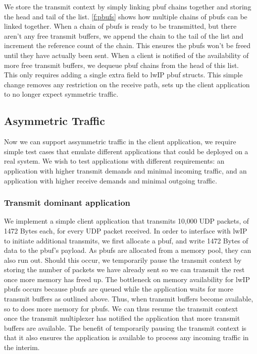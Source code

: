 We store the transmit context by simply linking pbuf chains together and storing the head and tail of the list. 
\ref{f:pbufs} shows how multiple chains of pbufs can be linked together. When a chain of pbufs is ready to
be transmitted, but there aren't any free transmit buffers, we append the chain to the tail of the list and 
increment the reference count of the chain. This ensures the pbufs won't be freed until they have actually been sent.
When a client is notified of the availability of more free transmit buffers, we dequeue pbuf chains from the head of
this list. This only requires adding a single extra field to lwIP pbuf structs. This simple change removes any
restriction on the receive path, sets up the client application to no longer expect symmetric traffic.\\

\subsection{Asymmetric Traffic}
Now we can support assymmetric traffic in the client application, we require simple test cases that emulate different
applications that could be deployed on a real system. We wish to test
applications with different requirements: an application with higher transmit demands and minimal incoming traffic,
and an application with higher receive demands and minimal outgoing traffic. 

\subsubsection{Transmit dominant application}\label{s:transmit_dom}
We implement a simple client application that transmits 10,000 UDP packets, of 1472 Bytes each, for every UDP packet received.
In order to interface with lwIP to initiate additional transmits, we first allocate a pbuf, and write 1472 Bytes of data
to the pbuf's payload. As pbufs are allocated from a memory pool, they can also run out. Should this occur, we temporarily
pause the transmit context by storing the number of packets we have already sent so we can transmit the rest once more 
memory has freed up. The bottleneck on memory availability for lwIP pbufs occurs because pbufs are queued while the application
waits for more transmit buffers as outlined above. Thus, when transmit buffers become available, so to does more memory for
pbufs. We can thus resume the transmit context once the transmit multiplexer has notified the application that more
transmit buffers are available. The benefit of temporarily pausing the transmit context is that it also ensures the application
is available to process any incoming traffic in the interim. 

